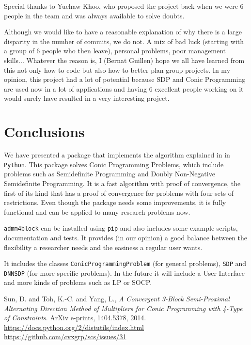 \documentclass[paper=a4, fontsize=11pt]{scrartcl}
\numberwithin{equation}{section}		%
\numberwithin{figure}{section}			%
\numberwithin{table}{section}				%
\begin{document}
Special thanks to Yuehaw Khoo, who proposed the project back when we were 6 people in the team and was always available to solve doubts.

Although we would like to have a reasonable explanation of why there is a large disparity in the number of commits, we do not. A mix of bad luck (starting with a group of 6 people who then leave), personal problems, poor management skills... Whatever the reason is, I (Bernat Guillen) hope we all have learned from this not only how to code but also how to better plan group projects. In my opinion, this project had a lot of potential because SDP and Conic Programming are used now in a lot of applications and having 6 excellent people working on it would surely have resulted in a very interesting project. 

\section{Conclusions}

We have presented a package that implements the algorithm explained in \cite{sun2014} in \texttt{Python}. This package solves Conic Programming Problems, which include problems such as Semidefinite Programming and Doubly Non-Negative Semidefinite Programming. It is a fast algorithm with proof of convergence, the first of its kind that has a proof of convergence for problems with four sets of restrictions. Even though the package needs some improvements, it is fully functional and can be applied to many research problems now. 

\texttt{admm4block} can be installed using \texttt{pip} and also includes some example scripts, documentation and tests. It provides (in our opinion) a good balance between the flexibility a researcher needs and the easiness a regular user wants. 

It includes the classes 
\texttt{ConicProgrammingProblem} (for general problems), \texttt{SDP} and \texttt{DNNSDP} (for more specific problems). In the future it will include a User Interface and more kinds of problems such as LP or SOCP.


\begin{thebibliography}{9}

  {{Sun}, D. and {Toh}, K.-C. and {Yang}, L.},
  \emph{A Convergent 3-Block Semi-Proximal Alternating Direction Method of Multipliers for Conic Programming with 4-Type of Constraints}.
  ArXiv e-prints,
  1404.5378,
  2014.
	\url{https://docs.python.org/2/distutils/index.html}
	\url{https://github.com/cvxgrp/scs/issues/31}
\end{thebibliography}


\end{document}
